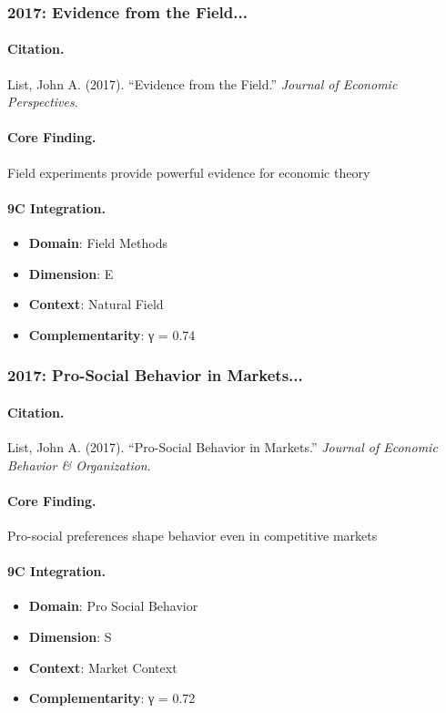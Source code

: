 \subsubsection{2017: Evidence from the Field...}

\paragraph{Citation.}
List, John A. (2017). ``Evidence from the Field.''
\textit{Journal of Economic Perspectives}.

\paragraph{Core Finding.}
Field experiments provide powerful evidence for economic theory

\paragraph{9C Integration.}
\begin{itemize}[nosep]
  \item \textbf{Domain}: Field Methods
  \item \textbf{Dimension}: E
  \item \textbf{Context}: Natural Field
  \item \textbf{Complementarity}: γ = 0.74
\end{itemize}


\subsubsection{2017: Pro-Social Behavior in Markets...}

\paragraph{Citation.}
List, John A. (2017). ``Pro-Social Behavior in Markets.''
\textit{Journal of Economic Behavior & Organization}.

\paragraph{Core Finding.}
Pro-social preferences shape behavior even in competitive markets

\paragraph{9C Integration.}
\begin{itemize}[nosep]
  \item \textbf{Domain}: Pro Social Behavior
  \item \textbf{Dimension}: S
  \item \textbf{Context}: Market Context
  \item \textbf{Complementarity}: γ = 0.72
\end{itemize}


